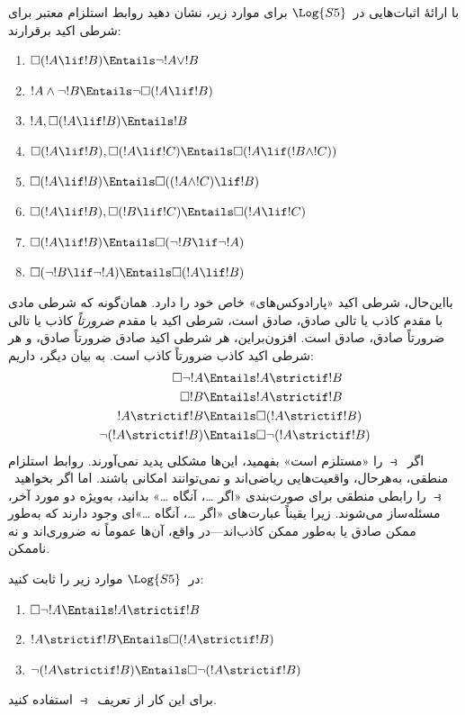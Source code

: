 \documentclass[../../../include/open-logic-section]{subfiles}
\begin{document}
\begin{prob}
  با ارائهٔ اثبات‌هایی در~$\Log{S5}$ برای موارد زیر، نشان دهید روابط
  استلزام معتبر برای شرطی اکید برقرارند:
  \begin{enumerate}
  \item  $\Box(!A \lif !B) \Entails \lnot !A \lor !B$
  \item $!A \land \lnot !B \Entails \lnot\Box(!A \lif !B)$
  \item $!A, \Box(!A \lif !B) \Entails !B$
  \item $\Box(!A \lif !B), \Box(!A \lif !C) \Entails \Box(!A \lif (!B
    \land !C))$
  \item $\Box(!A \lif !B) \Entails \Box((!A \land !C) \lif !B)$
  \item $\Box(!A \lif !B), \Box(!B \lif !C) \Entails \Box(!A
    \lif !C)$
  \item $\Box(!A \lif !B) \Entails \Box(\lnot !B \lif \lnot !A)$
  \item $\Box(\lnot !B \lif \lnot !A) \Entails \Box(!A \lif !B)$
  \end{enumerate}
  \end{prob}

بااین‌حال، شرطی اکید «پارادوکس‌های» خاص خود را دارد. همان‌گونه که شرطی
مادی با مقدم کاذب یا تالی صادق، صادق است، شرطی اکید با مقدم
\emph{ضرورتاً} کاذب یا تالی ضرورتاً صادق، صادق است. افزون‌براین، هر
شرطی اکید صادق ضرورتاً صادق، و هر شرطی اکید کاذب ضرورتاً کاذب است. به
بیان دیگر، داریم:
\begin{align}
  \Box \lnot !A & \Entails !A \strictif !B\\
  \Box !B & \Entails !A \strictif !B\\
  !A \strictif !B& \Entails \Box(!A \strictif !B)\\
  \lnot(!A \strictif !B) & \Entails \Box\lnot(!A \strictif !B)
\end{align}
اگر~$\strictif$ را «مستلزم است» بفهمید، این‌ها مشکلی پدید نمی‌آورند.
روابط استلزام منطقی، به‌هرحال، واقعیت‌هایی ریاضی‌اند و نمی‌توانند امکانی
باشند. اما اگر بخواهید~$\strictif$ را رابطی منطقی برای صورت‌بندی «اگر
\dots، آنگاه \dots» بدانید، به‌ویژه دو مورد آخر، مسئله‌ساز می‌شوند.
زیرا یقیناً عبارت‌های «اگر \dots، آنگاه \dots»ای وجود دارند که به‌طور
ممکن صادق یا به‌طور ممکن کاذب‌اند---در واقع، آن‌ها عموماً نه ضروری‌اند
و نه ناممکن.

\begin{prob}
  در~$\Log{S5}$ موارد زیر را ثابت کنید:
  \begin{enumerate}
    \item  $\Box \lnot !A \Entails !A \strictif !B$
    \item $!A \strictif !B \Entails \Box(!A \strictif !B)$
    \item $\lnot(!A \strictif !B)  \Entails \Box\lnot(!A \strictif !B)$
  \end{enumerate}
  برای این کار از تعریف~$\strictif$ استفاده کنید.
\end{prob}
\end{document}
